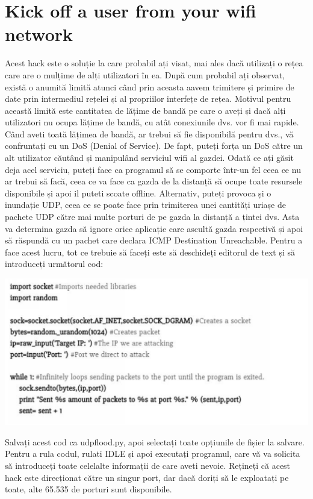 \documentclass[oneside,20pt]{article}          %
\begin{document}
\section{Kick off a user from your wifi network}
Acest hack este o soluție la care probabil ați visat, mai ales dacă utilizați o
rețea care are o mulțime de alți utilizatori în ea. După cum probabil ați observat, există o anumită limită atunci când prin aceasta aavem trimitere și primire de date prin intermediul rețelei și al propriilor interfețe de rețea. Motivul pentru această limită este cantitatea de lățime de bandă pe care o aveți și dacă alți utilizatori nu ocupa  lățime de bandă, cu atât conexiunile dvs. vor fi mai rapide.
Când aveti toată lățimea de bandă, ar trebui să fie disponibilă pentru dvs., vă confruntați cu un DoS (Denial of
Service). De fapt, puteți forța un DoS către un alt utilizator căutând și manipulând serviciul wifi  al gazdei. Odată ce ați găsit deja acel serviciu, puteți face ca programul să se comporte într-un fel ceea ce nu ar trebui să facă, ceea ce va face ca gazda de la distanță să ocupe toate resursele disponibile și apoi il puteti scoate offline. Alternativ, puteți provoca și o inundație UDP, ceea ce se poate face
prin trimiterea unei cantități uriașe de pachete UDP către mai multe porturi de pe gazda la distanță a țintei dvs. Asta va
determina gazda să ignore orice aplicație care ascultă gazda respectivă și apoi să răspundă
cu un pachet care declara ICMP Destination Unreachable.
Pentru a face acest lucru, tot ce trebuie să faceți este să deschideți editorul de text și să introduceți următorul cod:
\begin{center}
\includegraphics[height=5 cm]{2.png}
\end{center}
Salvați acest cod ca udpflood.py, apoi selectați toate opțiunile de fișier la salvare. Pentru a rula codul, rulati IDLE și apoi executați programul, care vă va solicita să introduceți toate celelalte informații de care aveti nevoie. Rețineți că acest hack este direcționat către un singur port, dar dacă doriți să le exploatați pe toate, alte 65.535 de porturi sunt disponibile.
\end{document}
